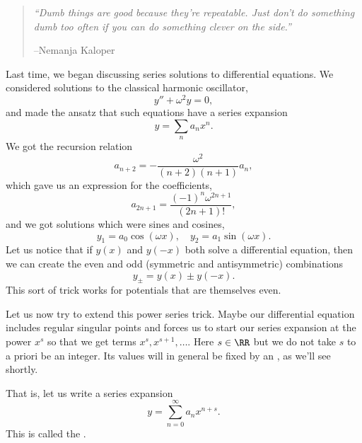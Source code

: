 \begin{quote}
    \textit{``Dumb things are good because they're repeatable. Just don't do something dumb too often if you can do something clever on the side.''}
    
    --Nemanja Kaloper
\end{quote}

Last time, we began discussing series solutions to differential equations.
We considered solutions to the classical harmonic oscillator,
\begin{equation}
    y'' + \omega^2 y = 0,
\end{equation}
and made the ansatz that such equations have a series expansion
\begin{equation}
    y= \sum_n a_n x^n.
\end{equation}
We got the recursion relation
\begin{equation}
     a_{n+2} = -\frac{\omega^2}{(n+2)(n+1)}a_n,
\end{equation}
which gave us an expression for the coefficients,
\begin{equation}
    a_{2n+1} = \frac{(-1)^n \omega^{2n+1}}{(2n+1)!},
\end{equation}
and we got solutions which were sines and cosines,
\begin{equation}
    y_1 = a_0 \cos(\omega x), \quad y_2 = a_1 \sin(\omega x).
\end{equation}
Let us notice that if $y(x)$ and $y(-x)$ both solve a differential equation, then we can create the even and odd (symmetric and antisymmetric) combinations
\begin{equation}
    y_\pm = y(x) \pm y(-x).
\end{equation}
This sort of trick works for potentials that are themselves even.

Let us now try to extend this power series trick. Maybe our differential equation includes regular singular points and forces us to start our series expansion at the power $x^s$ so that we get terms $x^s, x^{s+1},\ldots$. Here $s\in\RR$ but we do not take $s$ to a priori be an integer. Its values will in general be fixed by an , as we'll see shortly.

That is, let us write a series expansion
\begin{equation}
    y = \sum_{n=0}^\infty a_n x^{n+s}.
\end{equation}
This is called the .

